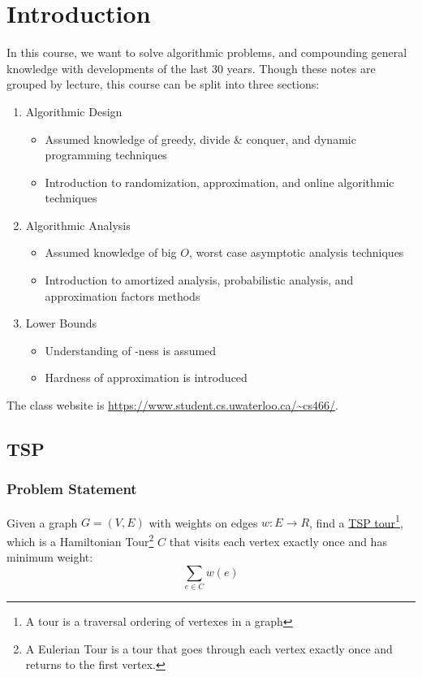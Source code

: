     \chapter{Introduction} %
    \label{cha:introduction}
        In this course, we want to solve algorithmic problems, and compounding general knowledge with developments of the last 30 years.
        Though these notes are grouped by lecture, this course can be split into three sections:
        \begin{enumerate}
            \item Algorithmic Design
            \begin{itemize}
                \item Assumed knowledge of greedy, divide \& conquer, and dynamic programming techniques
                \item Introduction to randomization, approximation, and online algorithmic techniques
            \end{itemize}
            \item Algorithmic Analysis
            \begin{itemize}
                \item Assumed knowledge of big $O$, worst case asymptotic analysis techniques
                \item Introduction to amortized analysis, probabilistic analysis, and approximation factors methods
            \end{itemize}
            \item Lower Bounds
            \begin{itemize}
                \item Understanding of \npcomplete-ness is assumed
                \item Hardness of approximation is introduced
            \end{itemize}
        \end{enumerate}
        The class website is \url{https://www.student.cs.uwaterloo.ca/~cs466/}.

        \section{TSP} %
        \label{sec:tsp}
            \subsection{Problem Statement} %
            \label{sub:problem_statement}
                Given a graph $G = (V, E)$ with weights on edges $w : E \to R$, find a \uline{TSP tour}\footnote{A tour is a traversal ordering of vertexes in a graph}, which is a Hamiltonian Tour\footnote{A Eulerian Tour is a tour that goes through each vertex exactly once and returns to the first vertex.} $C$ that visits each vertex exactly once and has minimum weight:
                \[ \sum_{e \in C} w(e) \]


